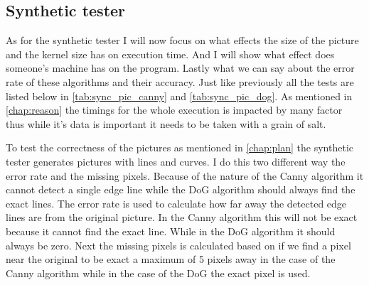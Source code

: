 \subsection{Synthetic tester}
\label{chap:test_synt_test}

As for the synthetic tester I will now focus on what effects the size of the picture and the kernel size has on execution time. And I will show what effect does someone's machine has on the program. Lastly what we can say about the error rate of these algorithms and their accuracy. Just like previously all the tests are listed below in \autoref{tab:sync_pic_canny} and \autoref{tab:sync_pic_dog}. As mentioned in \autoref{chap:reason} the timings for the whole execution is impacted by many factor thus while it's data is important it needs to be taken with a grain of salt.

To test the correctness of the pictures as mentioned in \autoref{chap:plan} the synthetic tester generates pictures with lines and curves. I do this two different way the error rate and the missing pixels. Because of the nature of the \ac{Canny} algorithm it cannot detect a single edge line while the \ac{DoG} algorithm should always find the exact lines. The error rate is used to calculate how far away the detected edge lines are from the original picture. In the \ac{Canny} algorithm this will not be exact because it cannot find the exact line. While in the \ac{DoG} algorithm it should always be zero. Next the missing pixels is calculated based on if we find a pixel near the original to be exact a maximum of 5 pixels away in the case of the \ac{Canny} algorithm while in the case of the \ac{DoG} the exact pixel is used.

\begin{table}[H]
\centering
{}
\caption{Test plans for the  Synthetic tester for \ac{Canny} algorithm}
\label{tab:sync_pic_canny}
\end{table}

